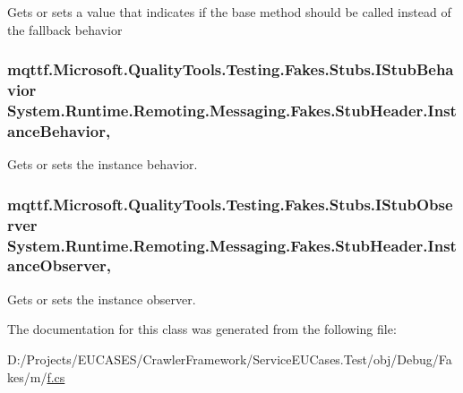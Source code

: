 Gets or sets a value that indicates if the base method should be called instead of the fallback behavior

\hypertarget{class_system_1_1_runtime_1_1_remoting_1_1_messaging_1_1_fakes_1_1_stub_header_abdf17f18de22bcb648a2948e62e63c2e}{
\subsubsection[{Instance\-Behavior}]{\setlength{\rightskip}{0pt plus 5cm}mqttf.\-Microsoft.\-Quality\-Tools.\-Testing.\-Fakes.\-Stubs.\-I\-Stub\-Behavior System.\-Runtime.\-Remoting.\-Messaging.\-Fakes.\-Stub\-Header.\-Instance\-Behavior\hspace{0.3cm}{\ttfamily [get]}, {\ttfamily [set]}}}\label{class_system_1_1_runtime_1_1_remoting_1_1_messaging_1_1_fakes_1_1_stub_header_abdf17f18de22bcb648a2948e62e63c2e}


Gets or sets the instance behavior.

\hypertarget{class_system_1_1_runtime_1_1_remoting_1_1_messaging_1_1_fakes_1_1_stub_header_a09ec4345f25e5c08edea64b9acc62962}{
\subsubsection[{Instance\-Observer}]{\setlength{\rightskip}{0pt plus 5cm}mqttf.\-Microsoft.\-Quality\-Tools.\-Testing.\-Fakes.\-Stubs.\-I\-Stub\-Observer System.\-Runtime.\-Remoting.\-Messaging.\-Fakes.\-Stub\-Header.\-Instance\-Observer\hspace{0.3cm}{\ttfamily [get]}, {\ttfamily [set]}}}\label{class_system_1_1_runtime_1_1_remoting_1_1_messaging_1_1_fakes_1_1_stub_header_a09ec4345f25e5c08edea64b9acc62962}


Gets or sets the instance observer.



The documentation for this class was generated from the following file\-:\begin{DoxyCompactItemize}
\item 
D\-:/\-Projects/\-E\-U\-C\-A\-S\-E\-S/\-Crawler\-Framework/\-Service\-E\-U\-Cases.\-Test/obj/\-Debug/\-Fakes/m/\hyperlink{m_2f_8cs}{f.\-cs}\end{DoxyCompactItemize}
